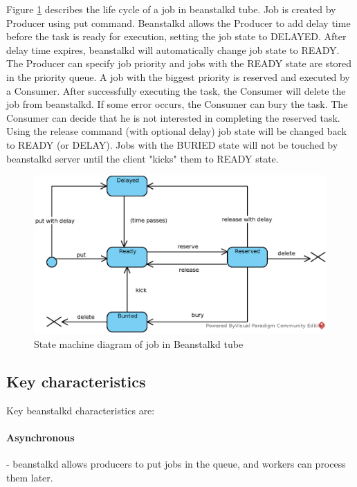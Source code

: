     Figure \ref{fig:beanstalkdJobSM} describes the life cycle of a job in beanstalkd tube. Job is created by Producer using put command. Beanstalkd allows the Producer to add delay time before the task is ready for execution, setting the job state to DELAYED. After delay time expires, beanstalkd will automatically change job state to READY. The Producer can specify job priority and jobs with the READY state are stored in the priority queue. A job with the biggest priority is reserved and executed by a Consumer. After successfully executing the task, the Consumer will delete the job from beanstalkd. If some error occurs, the Consumer can bury the task. The Consumer can decide that he is not interested in completing the reserved task. Using the release command (with optional delay) job state will be changed back to READY (or DELAY). Jobs with the BURIED state will not be touched by beanstalkd server until the client "kicks" them to READY state.

    \begin{figure}[hbt]
        \centering
        \includegraphics[width=1\textwidth]{obrazky-figures/beanstalkd-job-states.eps}
        \caption{State machine diagram of job in Beanstalkd tube}
        \label{fig:beanstalkdJobSM}
    \end{figure}


    \subsection{Key characteristics}
    Key beanstalkd characteristics are:

    \paragraph{Asynchronous}- beanstalkd allows producers to put jobs in the queue, and workers can process them later.
